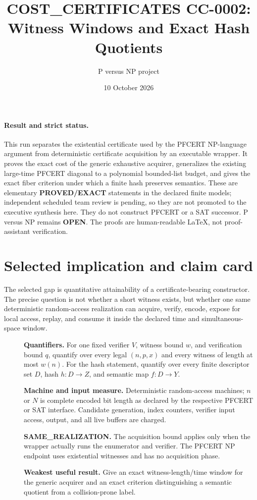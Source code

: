 \documentclass[11pt]{article}
\title{COST\_CERTIFICATES CC-0002:\\Witness Windows and Exact Hash Quotients}
\author{P versus NP project}
\date{10 October 2026}
\begin{document}
\maketitle

\paragraph{Result and strict status.}
This run separates the existential certificate used by the PFCERT
NP-language argument from deterministic certificate acquisition by an
executable wrapper.  It proves the exact cost of the generic exhaustive
acquirer, generalizes the existing large-time PFCERT diagonal to a
polynomial bounded-list budget, and gives the exact fiber criterion under
which a finite hash preserves semantics.  These are elementary
\textbf{PROVED/EXACT} statements in the declared finite models; independent
scheduled team review is pending, so they are not promoted to the executive
synthesis here.  They do not construct PFCERT or a SAT successor.
P versus NP remains \textbf{OPEN}.  The proofs are human-readable LaTeX,
not proof-assistant verification.

\section{Selected implication and claim card}
The selected gap is quantitative attainability of a certificate-bearing
constructor.  The precise question is not whether a short witness exists,
but whether one same deterministic random-access realization can acquire,
verify, encode, expose for local access, replay, and consume it inside the
declared time and simultaneous-space window.

\begin{description}
\item[] \textbf{Quantifiers.} For one fixed verifier $V$, witness bound
$w$, and verification bound $q$, quantify over every legal $(n,p,x)$ and
every witness of length at most $w(n)$.  For the hash statement, quantify
over every finite descriptor set $D$, hash $h:D\to Z$, and semantic map
$f:D\to Y$.
\item[] \textbf{Machine and input measure.} Deterministic random-access
machines; $n$ or $N$ is complete encoded bit length as declared by the
respective PFCERT or SAT interface.  Candidate generation, index counters,
verifier input access, output, and all live buffers are charged.
\item[] \textbf{SAME\_REALIZATION.} The acquisition bound applies only
when the wrapper actually runs the enumerator and verifier.  The PFCERT
NP endpoint uses existential witnesses and has no acquisition phase.
\item[] \textbf{Weakest useful result.} Give an exact witness-length/time
window for the generic acquirer and an exact criterion distinguishing a
semantic quotient from a collision-prone label.
\end{description}
\end{document}
